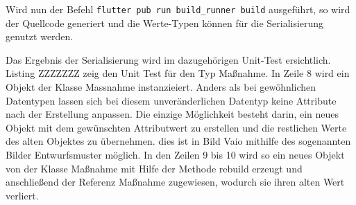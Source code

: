  

Wird nun der Befehl \texttt{flutter pub run build_runner build} ausgeführt, so wird der Quellcode generiert und die Werte-Typen können für die Serialisierung genutzt werden. 

Das Ergebnis der Serialisierung wird im dazugehörigen Unit-Test ersichtlich. Listing ZZZZZZZ zeig den Unit Test für den Typ Maßnahme.
In Zeile 8 wird ein Objekt der Klasse Massnahme instanzieiert. Anders als bei gewöhnlichen Datentypen lassen sich bei diesem unveränderlichen Datentyp keine Attribute nach der Erstellung anpassen. Die einzige Möglichkeit besteht darin, ein neues Objekt  mit dem gewünschten Attributwert zu erstellen und die  restlichen Werte des alten Objektes zu übernehmen.  dies ist in Bild Vaio mithilfe des sogenannten Bilder Entwurfsmuster möglich. In den Zeilen 9 bis 10 wird so ein neues Objekt von der Klasse Maßnahme mit Hilfe der Methode rebuild erzeugt und anschließend der Referenz Maßnahme zugewiesen, wodurch sie ihren alten Wert verliert.

 





